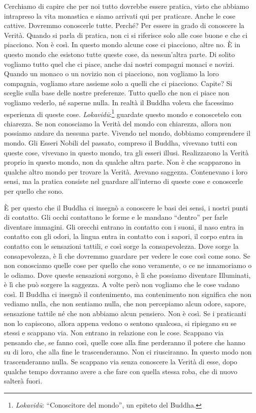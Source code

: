 Cerchiamo di capire che per noi tutto dovrebbe essere pratica, visto che
abbiamo intrapreso la vita monastica e siamo arrivati qui per praticare.
Anche le cose cattive. Dovremmo conoscerle tutte. Perché? Per essere in
grado di conoscere la Verità. Quando si parla di pratica, non ci si
riferisce solo alle cose buone e che ci piacciono. Non è così. In questo
mondo alcune cose ci piacciono, altre no. È in questo mondo che esistono
tutte queste cose, da nessun'altra parte. Di solito vogliamo tutto quel
che ci piace, anche dai nostri compagni monaci e novizi. Quando un
monaco o un novizio non ci piacciono, non vogliamo la loro compagnia,
vogliamo stare assieme solo a quelli che ci piacciono. Capite? Si
sceglie sulla base delle nostre preferenze. Tutto quello che non ci
piace non vogliamo vederlo, né saperne nulla. In realtà il Buddha voleva
che facessimo esperienza di queste cose. \emph{Lokavidū}:\footnote{\emph{Lokavidū}:
  ``Conoscitore del mondo'', un epiteto del Buddha.} guardate questo
mondo e conoscetelo con chiarezza. Se non conosciamo la Verità del mondo
con chiarezza, allora non possiamo andare da nessuna parte. Vivendo nel
mondo, dobbiamo comprendere il mondo. Gli Esseri Nobili del passato,
compreso il Buddha, vivevano tutti con queste cose, vivevano in questo
mondo, tra gli esseri illusi. Realizzarono la Verità proprio in questo
mondo, non da qualche altra parte. Non è che scapparono in qualche altro
mondo per trovare la Verità. Avevano saggezza. Contenevano i loro sensi,
ma la pratica consiste nel guardare all'interno di queste cose e
conoscerle per quello che sono.

È per questo che il Buddha ci insegnò a conoscere le basi dei sensi, i
nostri punti di contatto. Gli occhi contattano le forme e le mandano
``dentro'' per farle diventare immagini. Gli orecchi entrano in contatto
con i suoni, il naso entra in contatto con gli odori, la lingua entra in
contatto con i sapori, il corpo entra in contatto con le sensazioni
tattili, e così sorge la consapevolezza. Dove sorge la consapevolezza, è
lì che dovremmo guardare per vedere le cose così come sono. Se non
conosciamo quelle cose per quello che sono veramente, o ce ne
innamoriamo o le odiamo. Dove queste sensazioni sorgono, è lì che
possiamo diventare Illuminati, è lì che può sorgere la saggezza. A volte
però non vogliamo che le cose vadano così. Il Buddha ci insegnò il
contenimento, ma contenimento non significa che non vediamo nulla, che
non sentiamo nulla, che non percepiamo alcun odore, sapore, sensazione
tattile né che non abbiamo alcun pensiero. Non è così. Se i praticanti
non lo capiscono, allora appena vedono o sentono qualcosa, si ripiegano
su se stessi e scappano via. Non entrano in relazione con le cose.
Scappano via pensando che, se fanno così, quelle cose alla fine
perderanno il potere che hanno su di loro, che alla fine le
trascenderanno. Non ci riusciranno. In questo modo non trascenderanno
nulla. Se scappano via senza conoscere la Verità di esse, dopo qualche
tempo dovranno avere a che fare con quella stessa roba, che di nuovo
salterà fuori.


